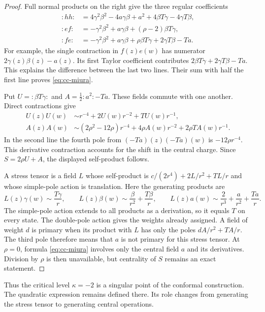 \begin{proof}
Full normal products on the right give the three regular coefficients
\begin{align*}
 :hh:&=4\gamma^2\beta^2-4a\gamma\beta+a^2
             +4\beta T\gamma-4\gamma T\beta,\\
 :ef:&=-\gamma^2\beta^2+a\gamma\beta+(\rho-2)\beta T\gamma,\\
 :fe:&=-\gamma^2\beta^2+a\gamma\beta+\rho\beta T\gamma
             +2\gamma T\beta-Ta.
\end{align*}
For example, the single contraction in $f(z)e(w)$ has numerator
$2\gamma(z)\beta(z)-a(z)$.
Its first Taylor coefficient contributes $2\beta T\gamma+2\gamma T\beta-Ta$.
This explains the difference between the last two lines.
Their sum with half the first line proves \eqref{eq:cc-miura}.

Put $U=:\beta T\gamma:$ and $A=\tfrac12:a^2:-Ta$.
These fields commute with one another.
Direct contractions give
\begin{align*}
 U(z)U(w)&\sim r^{-4}+2U(w)r^{-2}+TU(w)r^{-1},\\
 A(z)A(w)&\sim(2\rho^2-12\rho)r^{-4}
                    +4\rho A(w)r^{-2}+2\rho TA(w)r^{-1}.
\end{align*}
In the second line the fourth pole from $(-Ta)(z)(-Ta)(w)$ is $-12\rho r^{-4}$.
This derivative contraction accounts for the shift in the central charge.
Since $S=2\rho U+A$, the displayed self-product follows.

A stress tensor is a field $L$ whose self-product is
$c/(2r^4)+2L/r^2+TL/r$ and whose simple-pole action is translation.
Here the generating products are
\[
 L(z)\gamma(w)\sim\frac{T\gamma}{r},\qquad
 L(z)\beta(w)\sim\frac{\beta}{r^2}+\frac{T\beta}{r},\qquad
 L(z)a(w)\sim\frac2{r^3}+\frac a{r^2}+\frac{Ta}{r}.
\]
The simple-pole action extends to all products as a derivation, so it equals $T$ on every state.
The double-pole action gives the weights already assigned.
A field of weight $d$ is primary when its product with $L$ has only the poles
$dA/r^2+TA/r$.
The third pole therefore means that $a$ is not primary for this stress tensor.
At $\rho=0$, formula \eqref{eq:cc-miura} involves only the central field $a$ and its derivatives.
Division by $\rho$ is then unavailable, but centrality of $S$ remains an exact statement.
\end{proof}

Thus the critical level $\kappa=-2$ is a singular point of the conformal construction.
The quadratic expression remains defined there.
Its role changes from generating the stress tensor to generating central operations.

